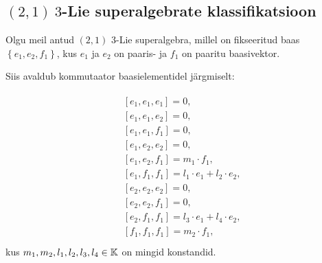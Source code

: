 
\subsection{\texorpdfstring{$(2, 1)\ 3$}\ -Lie superalgebrate klassifikatsioon}

Olgu meil antud $(2, 1)$ 3-Lie superalgebra, millel on fikseeritud baas
$\left\{ e_1, e_2, f_1 \right\}$, kus $e_1$ ja $e_2$ on paaris- ja
$f_1$ on paaritu baasivektor.

Siis avaldub kommutaator baasielementidel järgmiselt:

\begin{align}\label{samasused:2-1}
    \begin{split}
        & \left[e_1, e_1, e_1\right] = 0, \\
        & \left[e_1, e_1, e_2\right] = 0, \\
        & \left[e_1, e_1, f_1\right] = 0, \\
        & \left[e_1, e_2, e_2\right] = 0, \\
        & \left[e_1, e_2, f_1\right] = m_1 \cdot f_1, \\
        & \left[e_1, f_1, f_1\right] = l_1 \cdot e_1 + l_2 \cdot e_2, \\
        & \left[e_2, e_2, e_2\right] = 0, \\
        & \left[e_2, e_2, f_1\right] = 0, \\
        & \left[e_2, f_1, f_1\right] = l_3 \cdot e_1 + l_4 \cdot e_2, \\
        & \left[f_1, f_1, f_1\right] = m_2 \cdot f_1, \\
    \end{split}
\end{align}
kus $m_1, m_2, l_1, l_2, l_3, l_4 \in \mathbb{K}$ on mingid konstandid.

